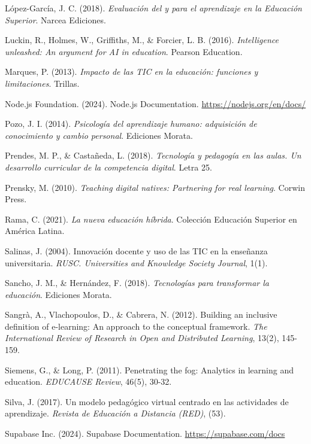 \documentclass[12pt,a4paper]{report}
\begin{document}
\begin{thebibliography}{99}
López-García, J. C. (2018). \textit{Evaluación del y para el aprendizaje en la Educación Superior}. Narcea Ediciones.

Luckin, R., Holmes, W., Griffiths, M., \& Forcier, L. B. (2016). \textit{Intelligence unleashed: An argument for AI in education}. Pearson Education.

Marques, P. (2013). \textit{Impacto de las TIC en la educación: funciones y limitaciones}. Trillas.

Node.js Foundation. (2024). Node.js Documentation. \url{https://nodejs.org/en/docs/}

Pozo, J. I. (2014). \textit{Psicología del aprendizaje humano: adquisición de conocimiento y cambio personal}. Ediciones Morata.

Prendes, M. P., \& Castañeda, L. (2018). \textit{Tecnología y pedagogía en las aulas. Un desarrollo curricular de la competencia digital}. Letra 25.

Prensky, M. (2010). \textit{Teaching digital natives: Partnering for real learning}. Corwin Press.

Rama, C. (2021). \textit{La nueva educación híbrida}. Colección Educación Superior en América Latina.

Salinas, J. (2004). Innovación docente y uso de las TIC en la enseñanza universitaria. \textit{RUSC. Universities and Knowledge Society Journal}, 1(1).

Sancho, J. M., \& Hernández, F. (2018). \textit{Tecnologías para transformar la educación}. Ediciones Morata.

Sangrà, A., Vlachopoulos, D., \& Cabrera, N. (2012). Building an inclusive definition of e-learning: An approach to the conceptual framework. \textit{The International Review of Research in Open and Distributed Learning}, 13(2), 145-159.

Siemens, G., \& Long, P. (2011). Penetrating the fog: Analytics in learning and education. \textit{EDUCAUSE Review}, 46(5), 30-32.

Silva, J. (2017). Un modelo pedagógico virtual centrado en las actividades de aprendizaje. \textit{Revista de Educación a Distancia (RED)}, (53).

Supabase Inc. (2024). Supabase Documentation. \url{https://supabase.com/docs}


\end{thebibliography}
\end{document}
